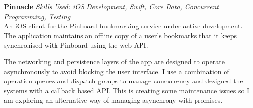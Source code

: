 \textbf{Pinnacle}  \newline
\textit{Skills Used: iOS Development, Swift, Core Data, Concurrent Programming, Testing} \\
An iOS client for the Pinboard bookmarking service under active development. The
application maintains an offline copy of a user's bookmarks that it keeps
synchronised with Pinboard using the web API.

The networking and persistence layers of the app are designed to operate
asynchronously to avoid blocking the user interface. I use a combination of
operation queues and dispatch groups to manage concurrency and designed the
systems with a callback based API. This is creating some maintenance issues so I
am exploring an alternative way of managing asynchrony with promises.


